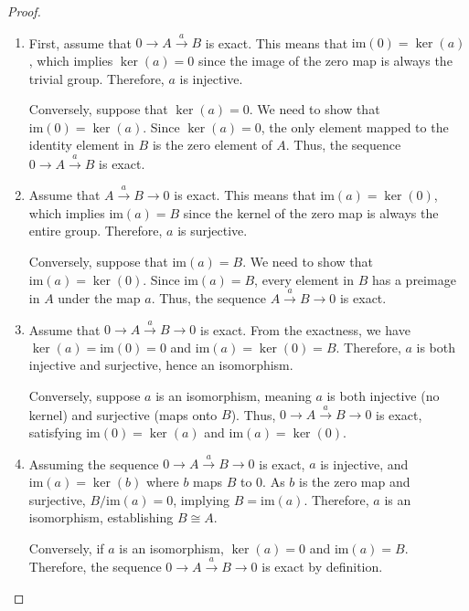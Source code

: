 \begin{proof}
	\begin{enumerate}
		\item First, assume that $0 \rightarrow A \xrightarrow{a}B$ is exact. This means
			that $\mathrm{im}(0) = \ker(a)$, which implies $\ker(a) = 0$ since the
			image of the zero map is always the trivial group. Therefore, $a$ is
			injective.

			Conversely, suppose that $\ker(a) = 0$. We need to show that
			$\mathrm{im}(0) = \ker(a)$. Since $\ker(a) = 0$, the only element mapped
			to the identity element in $B$ is the zero element of $A$. Thus, the
			sequence $0 \rightarrow A \xrightarrow{a}B$ is exact.

		\item Assume that $A \xrightarrow{a}B \rightarrow 0$ is exact. This means
			that $\mathrm{im}(a) = \ker(0)$, which implies $\mathrm{im}(a) = B$ since the
			kernel of the zero map is always the entire group. Therefore, $a$ is surjective.

			Conversely, suppose that $\mathrm{im}(a) = B$. We need to show that $\mathrm{im}
			(a) = \ker(0)$. Since $\mathrm{im}(a) = B$, every element in $B$ has a preimage
			in $A$ under the map $a$. Thus, the sequence $A \xrightarrow{a}B \rightarrow
			0$ is exact.

		\item Assume that $0 \rightarrow A \xrightarrow{a}B \rightarrow 0$ is exact.
			From the exactness, we have $\ker(a) = \mathrm{im}(0) = 0$ and $\mathrm{im}
			(a) = \ker(0) = B$. Therefore, $a$ is both injective and surjective, hence
			an isomorphism.

			Conversely, suppose $a$ is an isomorphism, meaning $a$ is both injective (no
			kernel) and surjective (maps onto $B$). Thus,
			$0 \rightarrow A \xrightarrow{a}B \rightarrow 0$ is exact, satisfying $\mathrm{im}
			(0) = \ker(a)$ and $\mathrm{im}(a) = \ker(0)$.

		\item Assuming the sequence $0 \rightarrow A \xrightarrow{a}B \rightarrow 0$
			is exact, $a$ is injective, and $\mathrm{im}(a) = \ker(b)$ where $b$ maps $B$
			to 0. As $b$ is the zero map and surjective, $B/\mathrm{im}(a) = 0$, implying
			$B = \mathrm{im}(a)$. Therefore, $a$ is an isomorphism, establishing
			$B \cong A$.

			Conversely, if $a$ is an isomorphism, $\ker(a) = 0$ and
			$\mathrm{im}(a) = B$. Therefore, the sequence
			$0 \rightarrow A \xrightarrow{a}B \rightarrow 0$ is exact by definition.
	\end{enumerate}
\end{proof}

